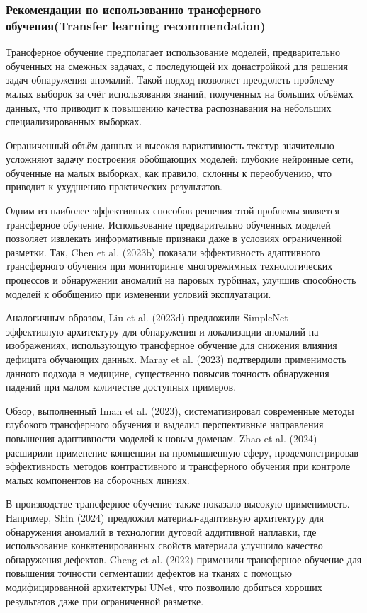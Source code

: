 \documentclass[14pt,a4paper]{article}
\begin{document}
\subsubsection{Рекомендации по использованию трансферного обучения(Transfer learning recommendation)}
Трансферное обучение предполагает использование моделей, предварительно обученных на смежных задачах, с последующей их донастройкой для решения задач обнаружения аномалий. Такой подход позволяет преодолеть проблему малых выборок за счёт использования знаний, полученных на больших объёмах данных, что приводит к повышению качества распознавания на небольших специализированных выборках.

Ограниченный объём данных и высокая вариативность текстур значительно усложняют задачу построения обобщающих моделей: глубокие нейронные сети, обученные на малых выборках, как правило, склонны к переобучению, что приводит к ухудшению практических результатов.

Одним из наиболее эффективных способов решения этой проблемы является трансферное обучение. Использование предварительно обученных моделей позволяет извлекать информативные признаки даже в условиях ограниченной разметки. Так, Chen et al. (2023b) показали эффективность адаптивного трансферного обучения при мониторинге многорежимных технологических процессов и обнаружении аномалий на паровых турбинах, улучшив способность моделей к обобщению при изменении условий эксплуатации.

Аналогичным образом, Liu et al. (2023d) предложили SimpleNet — эффективную архитектуру для обнаружения и локализации аномалий на изображениях, использующую трансферное обучение для снижения влияния дефицита обучающих данных. Maray et al. (2023) подтвердили применимость данного подхода в медицине, существенно повысив точность обнаружения падений при малом количестве доступных примеров.

Обзор, выполненный Iman et al. (2023), систематизировал современные методы глубокого трансферного обучения и выделил перспективные направления повышения адаптивности моделей к новым доменам. Zhao et al. (2024) расширили применение концепции на промышленную сферу, продемонстрировав эффективность методов контрастивного и трансферного обучения при контроле малых компонентов на сборочных линиях.

В производстве трансферное обучение также показало высокую применимость. Например, Shin (2024) предложил материал-адаптивную архитектуру для обнаружения аномалий в технологии дуговой аддитивной наплавки, где использование конкатенированных свойств материала улучшило качество обнаружения дефектов. Cheng et al. (2022) применили трансферное обучение для повышения точности сегментации дефектов на тканях с помощью модифицированной архитектуры UNet, что позволило добиться хороших результатов даже при ограниченной разметке.
\end{document}
